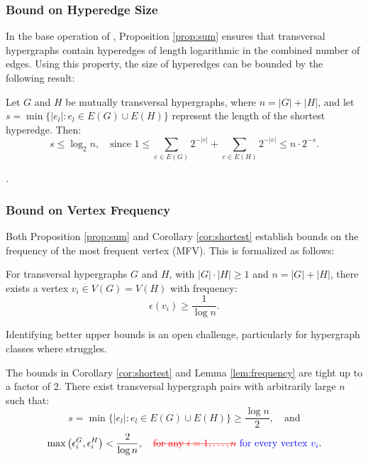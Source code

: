 \subsubsection*{Bound on Hyperedge Size}

In the base operation of \FKA, Proposition \ref{prop:sum} ensures that transversal hypergraphs contain hyperedges of length logarithmic in the combined number of edges. Using this property, the size of hyperedges can be bounded by the following result:

\begin{corollary}\label{cor:shortest}
Let $G$ and $H$ be mutually transversal hypergraphs, where $n=|G|+|H|$, and let $s=\min\{|e_l|:e_l\in E(G)\cup E(H)\}$ represent the length of the shortest hyperedge. Then:
\[
s\leq\log_2 n,\quad\text{since }1\leq\sum_{e\in E(G)}2^{-|e|}+\sum_{e\in E(H)}2^{-|e|}\leq n\cdot 2^{-s}.
\]
\end{corollary}
\noindent\textit{\cite{FK96}.}

\subsubsection*{Bound on Vertex Frequency}

Both Proposition \ref{prop:sum} and Corollary \ref{cor:shortest} establish bounds on the frequency of the most frequent vertex (MFV). This is formalized as follows:

\begin{lemma}\label{lem:frequency}
For transversal hypergraphs $G$ and $H$, with $|G|\cdot|H|\geq 1$ and $n=|G|+|H|$, there exists a vertex $v_i\in V(G)=V(H)$ with frequency:
\[
\epsilon(v_i)\geq\frac{1}{\log n}.
\]
\end{lemma}
\noindent\textit{\cite{FK96}}

  Identifying better upper bounds is an open challenge, particularly for hypergraph classes where \FKA{} struggles.

\begin{observation}\label{obs:tight}
The bounds in Corollary \ref{cor:shortest} and Lemma \ref{lem:frequency} are tight up to a factor of 2. There exist transversal hypergraph pairs with arbitrarily large $n$ such that:
\[
s=\min\{|e_l|:e_l\in E(G)\cup E(H)\}\geq\frac{\log n}{2},\quad\text{and}
\]
\[
\max\left(\epsilon_i^G,\epsilon_i^H\right)<\frac{2}{\log n},\quad\text{\wrong{for any $i=1,\dots,n$}}\ \text{\fix{for every vertex $v_i$}}.
\]
\end{observation}
\noindent\textit{\cite{FK96}}

